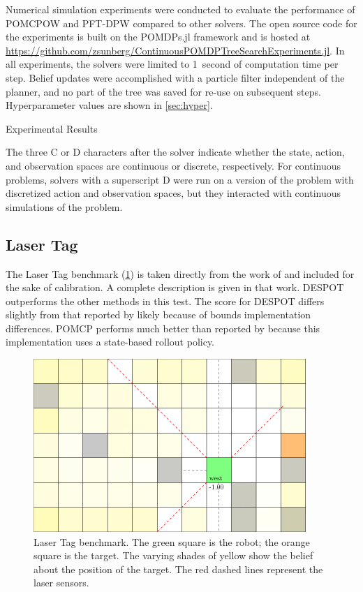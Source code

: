 Numerical simulation experiments were conducted to evaluate the performance of POMCPOW and PFT-DPW compared to other solvers. The open source code for the experiments is built on the POMDPs.jl framework \cite{egorov2017pomdps} and is hosted at \url{https://github.com/zsunberg/ContinuousPOMDPTreeSearchExperiments.jl}. In all experiments, the solvers were limited to \SI{1}{second} of computation time per step. Belief updates were accomplished with a particle filter independent of the planner, and no part of the tree was saved for re-use on subsequent steps. Hyperparameter values are shown in \cref{sec:hyper}.

\begin{table}
    {
        \caption{Experimental Results} \label{tab:experiments}

        
    }
    \vspace{5mm}
    \footnotesize{The three C or D characters after the solver indicate whether the state, action, and observation spaces are continuous or discrete, respectively. For continuous problems, solvers with a superscript D were run on a version of the problem with discretized action and observation spaces, but they interacted with continuous simulations of the problem.}
\end{table}

\subsection{Laser Tag}

The Laser Tag benchmark (\cref{fig:lasertag}) is taken directly from the work of \citet{somani2013despot} and included for the sake of calibration. A complete description is given in that work. DESPOT outperforms the other methods in this test. The score for DESPOT differs slightly from that reported by \citet{somani2013despot} likely because of bounds implementation differences.
POMCP performs much better than reported by \citet{somani2013despot} because this implementation uses a state-based rollout policy.

\begin{figure}[htpb]
    \centering
    \includegraphics[width=0.6\linewidth]{media/lasertag.png}
    \caption[Laser Tag benchmark]{Laser Tag benchmark. The green square is the robot; the orange square is the target. The varying shades of yellow show the belief about the position of the target. The red dashed lines represent the laser sensors.}
    \label{fig:lasertag}
\end{figure}

